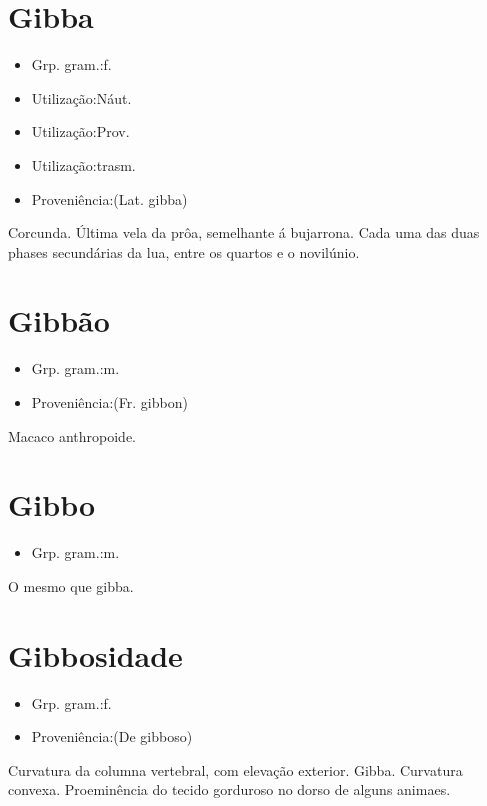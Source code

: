 \section{Gibba}
\begin{itemize}
\item {Grp. gram.:f.}
\end{itemize}
\begin{itemize}
\item {Utilização:Náut.}
\end{itemize}
\begin{itemize}
\item {Utilização:Prov.}
\end{itemize}
\begin{itemize}
\item {Utilização:trasm.}
\end{itemize}
\begin{itemize}
\item {Proveniência:(Lat. \textunderscore gibba\textunderscore )}
\end{itemize}
Corcunda.
Última vela da prôa, semelhante á bujarrona.
Cada uma das duas phases secundárias da lua, entre os quartos e o novilúnio.
\section{Gibbão}
\begin{itemize}
\item {Grp. gram.:m.}
\end{itemize}
\begin{itemize}
\item {Proveniência:(Fr. \textunderscore gibbon\textunderscore )}
\end{itemize}
Macaco anthropoide.
\section{Gibbo}
\begin{itemize}
\item {Grp. gram.:m.}
\end{itemize}
O mesmo que \textunderscore gibba\textunderscore .
\section{Gibbosidade}
\begin{itemize}
\item {Grp. gram.:f.}
\end{itemize}
\begin{itemize}
\item {Proveniência:(De \textunderscore gibboso\textunderscore )}
\end{itemize}
Curvatura da columna vertebral, com elevação exterior.
Gibba.
Curvatura convexa.
Proeminência do tecido gorduroso no dorso de alguns animaes.
